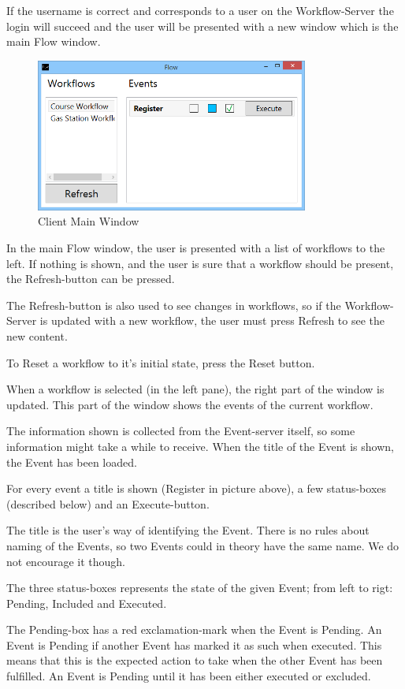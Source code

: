 If the username is correct and corresponds to a user on the
Workflow-Server the login will succeed and the user will be presented
with a new window which is the main Flow window.

\begin{figure}[h]
\centering
\includegraphics[width=0.8\textwidth]{ClientMainView.png}
\caption{Client Main Window}
\end{figure}

In the main Flow window, the user is presented with a list of workflows
to the left. If nothing is shown, and the user is sure that a workflow
should be present, the Refresh-button can be pressed.

The Refresh-button is also used to see changes in workflows, so if the
Workflow-Server is updated with a new workflow, the user must press
Refresh to see the new content.

To Reset a workflow to it's initial state, press the Reset button.

When a workflow is selected (in the left pane), the right part of the
window is updated. This part of the window shows the events of the
current workflow.

The information shown is collected from the Event-server itself, so some
information might take a while to receive. When the title of the Event
is shown, the Event has been loaded.

For every event a title is shown (Register in picture above), a few
status-boxes (described below) and an Execute-button.

The title is the user's way of identifying the Event. There is no rules
about naming of the Events, so two Events could in theory have the same
name. We do not encourage it though.

The three status-boxes represents the state of the given Event; from
left to rigt: Pending, Included and Executed.

The Pending-box has a red exclamation-mark when the Event is Pending. An
Event is Pending if another Event has marked it as such when executed.
This means that this is the expected action to take when the other Event
has been fulfilled. An Event is Pending until it has been either
executed or excluded.

